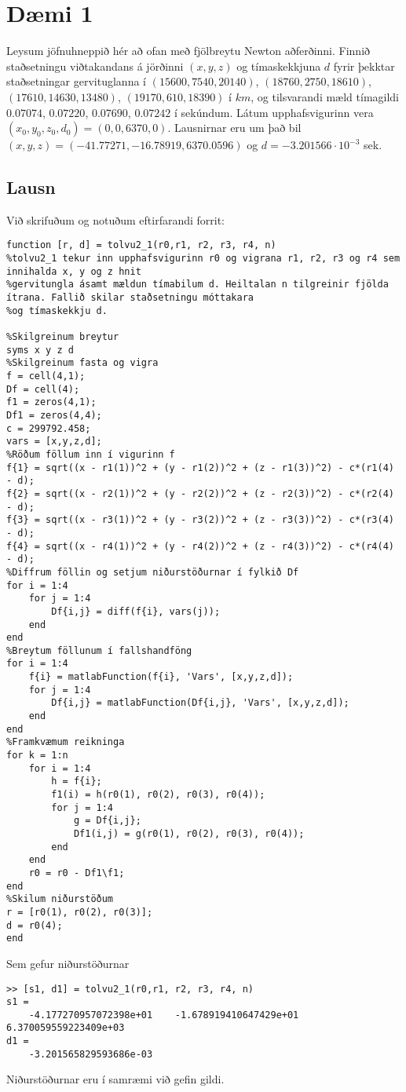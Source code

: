 \documentclass[11pt]{article}
\begin{document}
\section*{Dæmi 1}
Leysum jöfnuhneppið hér að ofan með fjölbreytu Newton aðferðinni. Finnið staðsetningu viðtakandans á jörðinni $(x,y,z)$ og tímaskekkjuna $d$ fyrir þekktar staðsetningar gervituglanna í $(15600,7540,20140)$, $(18760,2750,18610)$, $(17610,14630,13480)$, $(19170,610,18390)$ í $km$, og tilsvarandi mæld tímagildi $0.07074$, $0.07220$, $0.07690$, $0.07242$ í sekúndum. Látum upphafsvigurinn vera $(x_0, y_0, z_0, d_0) = (0,0,6370,0)$. Lausnirnar eru um það bil $(x,y,z) = (-41.77271,-16.78919,6370.0596)$ og $d =-3.201566 \cdot 10^{-3}$ sek. 

\subsection*{Lausn}
Við skrifuðum og notuðum eftirfarandi forrit:

\begin{verbatim}
function [r, d] = tolvu2_1(r0,r1, r2, r3, r4, n)
%tolvu2_1 tekur inn upphafsvigurinn r0 og vigrana r1, r2, r3 og r4 sem innihalda x, y og z hnit
%gervitungla ásamt mældun tímabilum d. Heiltalan n tilgreinir fjölda ítrana. Fallið skilar staðsetningu móttakara
%og tímaskekkju d.

%Skilgreinum breytur
syms x y z d
%Skilgreinum fasta og vigra
f = cell(4,1);
Df = cell(4);
f1 = zeros(4,1);
Df1 = zeros(4,4);
c = 299792.458;
vars = [x,y,z,d];
%Röðum föllum inn í vigurinn f
f{1} = sqrt((x - r1(1))^2 + (y - r1(2))^2 + (z - r1(3))^2) - c*(r1(4) - d);
f{2} = sqrt((x - r2(1))^2 + (y - r2(2))^2 + (z - r2(3))^2) - c*(r2(4) - d);
f{3} = sqrt((x - r3(1))^2 + (y - r3(2))^2 + (z - r3(3))^2) - c*(r3(4) - d);
f{4} = sqrt((x - r4(1))^2 + (y - r4(2))^2 + (z - r4(3))^2) - c*(r4(4) - d);
%Diffrum föllin og setjum niðurstöðurnar í fylkið Df
for i = 1:4
    for j = 1:4
        Df{i,j} = diff(f{i}, vars(j));
    end
end
%Breytum föllunum í fallshandföng
for i = 1:4
    f{i} = matlabFunction(f{i}, 'Vars', [x,y,z,d]);
    for j = 1:4
        Df{i,j} = matlabFunction(Df{i,j}, 'Vars', [x,y,z,d]);
    end
end
%Framkvæmum reikninga
for k = 1:n
    for i = 1:4
        h = f{i};
        f1(i) = h(r0(1), r0(2), r0(3), r0(4));
        for j = 1:4
            g = Df{i,j};
            Df1(i,j) = g(r0(1), r0(2), r0(3), r0(4));
        end
    end
    r0 = r0 - Df1\f1;
end
%Skilum niðurstöðum
r = [r0(1), r0(2), r0(3)];
d = r0(4);
end
\end{verbatim}
Sem gefur niðurstöðurnar
\begin{verbatim}
>> [s1, d1] = tolvu2_1(r0,r1, r2, r3, r4, n)
s1 =
    -4.177270957072398e+01    -1.678919410647429e+01     6.370059559223409e+03
d1 =
    -3.201565829593686e-03
\end{verbatim}
Niðurstöðurnar eru í samræmi við gefin gildi.
\newpage
\end{document}
